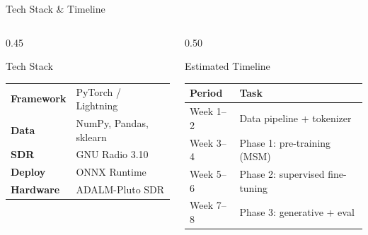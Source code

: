 \documentclass[aspectratio=169, 10pt]{beamer}
\begin{document}
\begin{frame}{Tech Stack \& Timeline}
\small
\begin{columns}[T]
\begin{column}{0.45\textwidth}
\begin{block}{Tech Stack}
\footnotesize
\renewcommand{\arraystretch}{1.3}
\begin{tabular}{@{}ll@{}}
\textbf{Framework}  & PyTorch / Lightning \\
\textbf{Data}       & NumPy, Pandas, sklearn \\
\textbf{SDR}        & GNU Radio 3.10 \\
\textbf{Deploy}     & ONNX Runtime \\
\textbf{Hardware}   & ADALM-Pluto SDR \\
\end{tabular}
\end{block}
\end{column}

\begin{column}{0.50\textwidth}
\begin{exampleblock}{Estimated Timeline}
\footnotesize
\renewcommand{\arraystretch}{1.3}
\begin{tabular}{@{}ll@{}}
\toprule
\textbf{Period} & \textbf{Task} \\
\midrule
Week 1--2 & Data pipeline + tokenizer \\
Week 3--4 & Phase 1: pre-training (MSM) \\
Week 5--6 & Phase 2: supervised fine-tuning \\
Week 7--8 & Phase 3: generative + eval \\
\bottomrule
\end{tabular}
\end{exampleblock}
\end{column}
\end{columns}
\end{frame}


\end{document}
